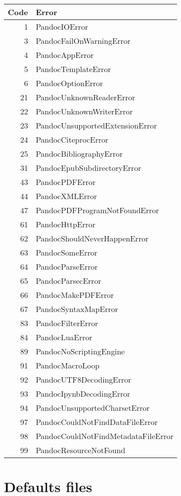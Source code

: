 \begin{longtable}[]{@{}rl@{}}
\toprule()
Code & Error \\
\midrule()
\endhead
1 & PandocIOError \\
3 & PandocFailOnWarningError \\
4 & PandocAppError \\
5 & PandocTemplateError \\
6 & PandocOptionError \\
21 & PandocUnknownReaderError \\
22 & PandocUnknownWriterError \\
23 & PandocUnsupportedExtensionError \\
24 & PandocCiteprocError \\
25 & PandocBibliographyError \\
31 & PandocEpubSubdirectoryError \\
43 & PandocPDFError \\
44 & PandocXMLError \\
47 & PandocPDFProgramNotFoundError \\
61 & PandocHttpError \\
62 & PandocShouldNeverHappenError \\
63 & PandocSomeError \\
64 & PandocParseError \\
65 & PandocParsecError \\
66 & PandocMakePDFError \\
67 & PandocSyntaxMapError \\
83 & PandocFilterError \\
84 & PandocLuaError \\
89 & PandocNoScriptingEngine \\
91 & PandocMacroLoop \\
92 & PandocUTF8DecodingError \\
93 & PandocIpynbDecodingError \\
94 & PandocUnsupportedCharsetError \\
97 & PandocCouldNotFindDataFileError \\
98 & PandocCouldNotFindMetadataFileError \\
99 & PandocResourceNotFound \\
\bottomrule()
\end{longtable}

\hypertarget{defaults-files}{%
\section{Defaults files}\label{defaults-files}}

